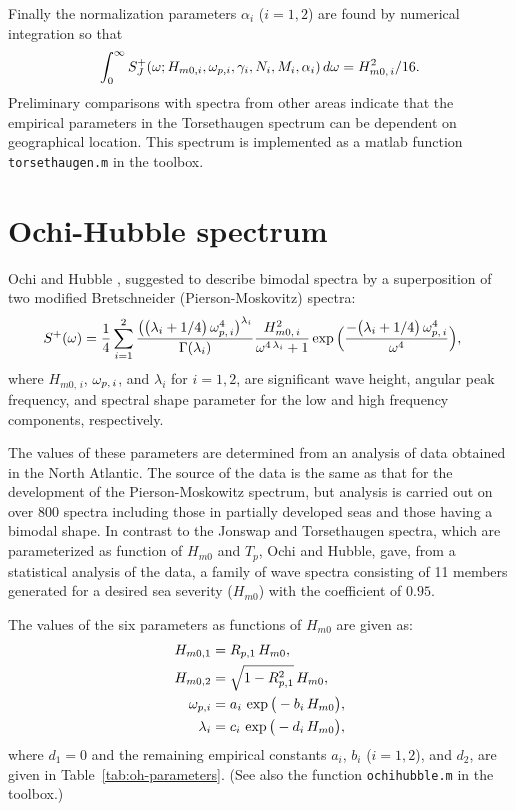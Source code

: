 Finally the normalization parameters $\alpha_{i}$ ($i=1,2$) are found by numerical
integration so that
\begin{align*}
\int_{0}^{\infty}
S_{J}^{+}(\omega ;H_{m0,i},\omega _{p,i},\gamma_{i},N_{i},M_{i},\alpha_{i})\,d\omega 
= H_{m0,\,i}^{2}/16.
\end{align*}
 Preliminary comparisons with spectra from other areas indicate that
 the empirical parameters in the Torsethaugen spectrum can be
 dependent on geographical location.
 This spectrum is implemented as a matlab function
 \verb+torsethaugen.m+ in the \progname{} toolbox.

\section{Ochi-Hubble spectrum}
\label{sec:ochi-hubble}
Ochi and Hubble \cite{OchiAndHubble1976Six}, suggested to describe bimodal spectra by a
superposition of two modified Bretschneider (Pierson-Moskovitz)
spectra:
 \begin{align*}   \label{eq:ohspec1} %
   S^{+}(\w) &=\frac{1}{4} \sum_{i=1}^{2}
   \frac{\big( \big( \lambda_{i}+1/4 \big) \, \w_{p,\,i}^{4}
\big)^{\lambda_{i}}}{\Gamma(\lambda_{i})}
   \frac{H_{m0,\,i}^{2}}{\w^{4 \, \lambda_{i}}+1}
   \exp \Big( \frac{-\big( \lambda_{i}+1/4 \big) \, \w_{p,\,i}^{4}}{\w^{4}}\Big),
 \end{align*}
where $H_{m0,\,i}$, $\omega _{p,\,i}$, and $\lambda_{i}$ for $i=1,2$, are
significant wave height, angular peak frequency, and spectral shape
parameter for the low and high frequency components, respectively.

 The values of these parameters are determined from an analysis of data
 obtained in the North Atlantic. The source of the data is the same as
 that for the development of the Pierson-Moskowitz spectrum, but
 analysis is carried out on over $800$ spectra including those in
 partially developed seas and those having a bimodal shape.
In contrast to the {\sc Jonswap}  and Torsethaugen spectra, which are
parameterized as function of $H_{m0}$ and $T_{p}$, Ochi and Hubble,
\cite{OchiAndHubble1976Six} gave, from a
 statistical analysis of the data, a family of wave spectra consisting
 of 11 members generated for a desired sea severity ($H_{m0}$) with the
 coefficient of $0.95$.

The values of the six parameters as functions of $H_{m0}$ are given as:
\begin{align*}
 H_{m0,1} &= R_{p,1} \, H_{m0}, \\
 H_{m0,2} &= \sqrt{1-R_{p,1}^{2}} \, H_{m0}, \\
 \omega _{p,i} &= a_{i}\,\exp \big( -b_{i}\, H_{m0} \big), \\
 \lambda_{i} &= c_{i}\,\exp \big( -d_{i}\, H_{m0} \big),
\end{align*}
where $d_{1}=0$ and the remaining empirical constants $a_{i}$, $b_{i}$
($i=1,2$), and $d_{2}$, are given in Table~\ref{tab:oh-parameters}.
(See also the function \verb+ochihubble.m+ in the \progname{} toolbox.)

